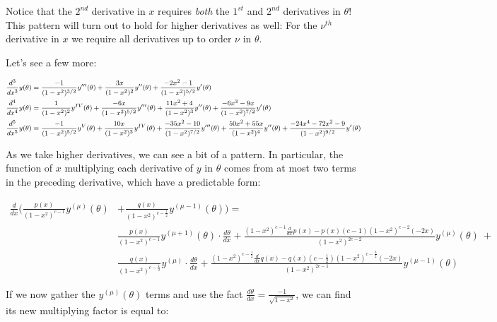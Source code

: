 \documentclass[10pt]{article}
\begin{document}
Notice that the $2^{nd}$ derivative in $x$ requires \textit{both} the $1^{st}$ and $2^{nd}$ derivatives in $\theta$! This pattern will turn out to hold for higher derivatives as well: For the $\nu^{th}$ derivative in $x$ we require all derivatives up to order $\nu$ in $\theta$.

Let's see a few more:

\begin{equation}\label{derivatives}
\footnotesize
\begin{aligned}
\frac{d^3}{dx^3} y(\theta) &= \frac{-1}{(1-x^2)^{3/2}} y'''(\theta) + \frac{3x}{(1-x^2)^2} y''(\theta) + \frac{-2x^2 - 1}{(1-x^2)^{5/2}} y'(\theta)\\
\frac{d^4}{dx^4} y(\theta) &= \frac{1}{(1-x^2)^2} y^{IV}(\theta) + \frac{-6x}{(1-x^2)^{5/2}} y'''(\theta) + \frac{11x^2 + 4}{(1-x^2)^3} y''(\theta) + \frac{-6x^3 - 9x}{(1-x^2)^{7/2}} y'(\theta)\\
\frac{d^5}{dx^5} y(\theta) &= \frac{-1}{(1-x^2)^{5/2}} y^V(\theta) + \frac{10x}{(1-x^2)^3} y^{IV}(\theta) + \frac{-35x^2-10}{(1-x^2)^{7/2}} y'''(\theta) + \frac{50x^2 + 55x}{(1-x^2)^4} y''(\theta) + \frac{-24x^4 -72x^2 - 9}{(1-x^2)^{9/2}} y'(\theta)\\
\end{aligned}
\normalsize
\end{equation}\vspace{2mm}

As we take higher derivatives, we can see a bit of a pattern. In particular, the function of $x$ multiplying each derivative of $y$ in $\theta$ comes from at most two terms in the preceding derivative, which have a predictable form:

\begin{align*}
\frac{d}{dx} \Big( \frac{p(x)}{(1-x^2)^{c-1}} y^{(\mu)}(\theta) &+ \frac{q(x)}{(1-x^2)^{c -\frac{1}{2}}} y^{(\mu-1)}(\theta) \Big) = \\
&\frac{p(x)}{(1-x^2)^{c-1}} y^{(\mu+1)}(\theta) \cdot \frac{d\theta}{dx} + \frac{(1 - x^2)^{c-1} \frac{d}{dx} p(x) - p(x)(c-1)(1-x^2)^{c-2}(-2x)}{(1-x^2)^{2c - 2}} y^{(\mu)}(\theta)\ +\\
&\frac{q(x)}{(1-x^2)^{c-\frac{1}{2}}} y^{(\mu)} \cdot \frac{d\theta}{dx} + \frac{(1 - x^2)^{c-\frac{1}{2}} \frac{d}{dx} q(x) - q(x)(c-\frac{1}{2})(1-x^2)^{c-\frac{3}{2}}(-2x)}{(1-x^2)^{2c - 1}} y^{(\mu-1)}(\theta)
\end{align*} 

If we now gather the $y^{(\mu)}(\theta)$ terms and use the fact $\frac{d\theta}{dx} = \frac{-1}{\sqrt{1-x^2}}$, we can find its new multiplying factor is equal to:
\end{document}

